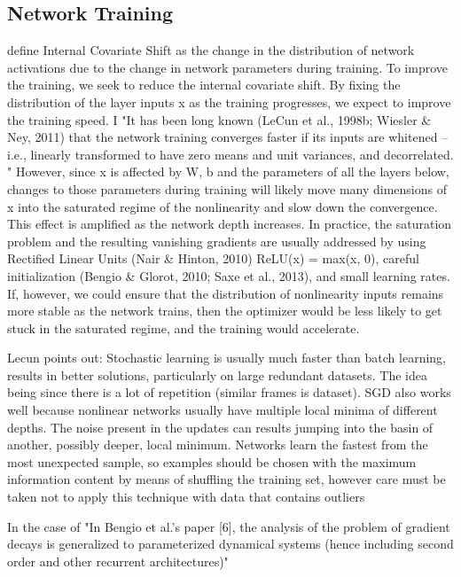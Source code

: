 \subsection{Network Training}

\cite{ioffe2015batch, 7005077}
define Internal Covariate Shift as the change in the
distribution of network activations due to the change in
network parameters during training. To improve the training, we seek to reduce the internal covariate shift. By
fixing the distribution of the layer inputs x as the training
progresses, we expect to improve the training speed. I
"It has
been long known (LeCun et al., 1998b; Wiesler \& Ney,
2011) that the network training converges faster if its inputs are whitened – i.e., linearly transformed to have zero means and unit variances, and decorrelated. "
However, since x is affected by
W, b and the parameters of all the layers below, changes
to those parameters during training will likely move many
dimensions of x into the saturated regime of the nonlinearity and slow down the convergence. This effect is
amplified as the network depth increases.
 In practice,
the saturation problem and the resulting vanishing gradients are usually addressed by using Rectified Linear Units
(Nair \& Hinton, 2010) ReLU(x) = max(x, 0), careful
initialization (Bengio \& Glorot, 2010; Saxe et al., 2013),
and small learning rates. If, however, we could ensure
that the distribution of nonlinearity inputs remains more
stable as the network trains, then the optimizer would be
less likely to get stuck in the saturated regime, and the
training would accelerate.

\cite{lecun2012efficient}
Lecun points out:
Stochastic learning is usually much faster than batch learning, results in better solutions, particularly on large redundant datasets. The idea being since there is a lot of repetition (similar frames is dataset). SGD also works well because nonlinear networks usually have multiple local minima of different depths. The noise present in the updates can results jumping into the basin of another, possibly deeper, local minimum. Networks learn the fastest from the most unexpected sample, so examples should be chosen with the maximum information content by means of shuffling the training set, however care must be taken not to apply this technique with data that contains outliers

In the case of "In Bengio et al.’s paper [6], the analysis of the problem of gradient decays
is generalized to parameterized dynamical systems (hence including second
order and other recurrent architectures)" \cite{hochreiter2001gradient}

